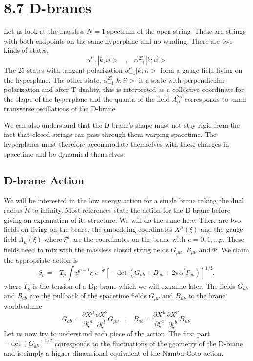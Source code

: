 \documentclass[12pt,letterpaper]{article}
\def\be{\begin{equation}}
\def\ee{\end{equation}}
\begin{document}
\section*{8.7 D-branes}
Let us look at the massless $N=1$ spectrum of the open string.  These are strings with both endpoints on the same hyperplane and no winding.  There are two kinds of states,
\be
\alpha_{-1}^{\mu}|k;ii>\;\;\;,\;\;\;\alpha_{-1}^{25}|k;ii>
\ee
The 25 states with tangent polarization $\alpha_{-1}^{\mu}|k;ii>$ form a gauge field living on the hyperplane.  The other state, $\alpha_{-1}^{25}|k;ii>$ is a state with perpendicular polarization and after T-duality, this is interpreted as a collective coordinate for the shape of the hyperplane and the quanta of the field $A^{25}_{ii}$ corresponds to small transverse oscillations of the D-brane.

We can also understand that the D-brane's shape must not stay rigid from the fact that closed strings can pass through them warping spacetime.  The hyperplanes must therefore accommodate themselves with
these changes in spacetime and be dynamical themselves.

\subsection*{D-brane Action}
We will be interested in the low energy action for a single brane taking the dual radius $\tilde{R}$ to infinity.  Most references state the action for the D-brane before giving an explanation of its structure.  We will do the same here.  There are two fields on living on the brane, the embedding coordinates $X^{\mu}(\xi)$ and the gauge field $A_{\mu}(\xi)$ where $\xi^{a}$ are the coordinates on the brane with $a=0,1,...p$.  These fields need to mix with the massless closed string fields $G_{\mu\nu}$, $B_{\mu\nu}$ and $\Phi$.  We claim the appropriate action is 
\be\label{BIaction}
S_{p}=-T_{p}\int d^{p+1}\xi\;e^{-\Phi}\left[-\det\left(G_{ab}+B_{ab}+2\pi\alpha^{\prime}F_{ab}\right)\right]^{1/2},
\ee
where $T_{p}$ is the tension of a Dp-brane which we will examine later.  The fields $G_{ab}$ and $B_{ab}$ are the pullback of the spacetime fields $G_{\mu\nu}$ and $B_{\mu\nu}$ to the brane worldvolume
\be
G_{ab}=\frac{\partial X^{\mu}}{\partial \xi^{a}}\frac{\partial X^{\nu}}{\partial \xi^{b}}G_{\mu\nu}\;\;\;,\;\;\;B_{ab}=\frac{\partial X^{\mu}}{\partial \xi^{a}}\frac{\partial X^{\nu}}{\partial \xi^{b}}B_{\mu\nu}.
\ee
Let us now try to understand each piece of the action.  The first part $-\det(G_{ab})^{1/2}$ corresponds to the fluctuations of the geometry of the D-brane and is simply a higher dimensional equivalent of the Nambu-Goto action.  
\end{document}
